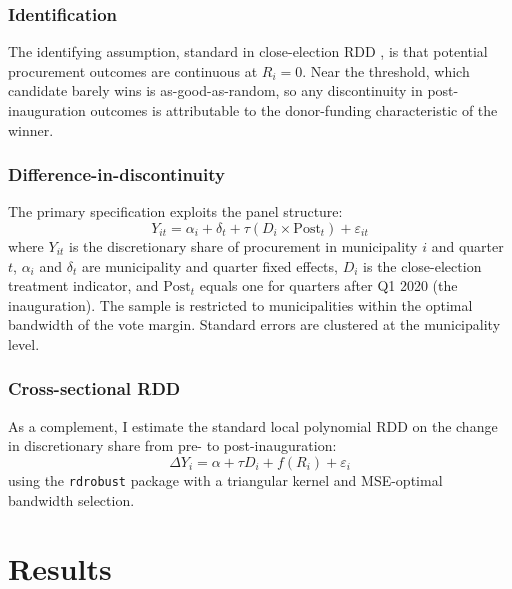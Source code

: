 \documentclass[12pt]{article}
\begin{document}
\subsubsection*{Identification} The identifying assumption, standard in close-election RDD \citep{lee2008randomized, leelemieux2010}, is that potential procurement outcomes are continuous at $R_i = 0$. Near the threshold, which candidate barely wins is as-good-as-random, so any discontinuity in post-inauguration outcomes is attributable to the donor-funding characteristic of the winner.

\subsubsection*{Difference-in-discontinuity} The primary specification exploits the panel structure:
\begin{equation}
Y_{it} = \alpha_i + \delta_t + \tau (D_i \times \text{Post}_t) + \varepsilon_{it}
\label{eq:did}
\end{equation}
where $Y_{it}$ is the discretionary share of procurement in municipality $i$ and quarter $t$, $\alpha_i$ and $\delta_t$ are municipality and quarter fixed effects, $D_i$ is the close-election treatment indicator, and $\text{Post}_t$ equals one for quarters after Q1 2020 (the inauguration). The sample is restricted to municipalities within the optimal bandwidth of the vote margin. Standard errors are clustered at the municipality level.

\subsubsection*{Cross-sectional RDD} As a complement, I estimate the standard local polynomial RDD on the change in discretionary share from pre- to post-inauguration:
\begin{equation}
\Delta Y_i = \alpha + \tau D_i + f(R_i) + \varepsilon_i
\end{equation}
using the \texttt{rdrobust} package \citep{cattaneo2019rdrobust} with a triangular kernel and MSE-optimal bandwidth selection.


\section{Results}
\label{sec:results}
\end{document}
